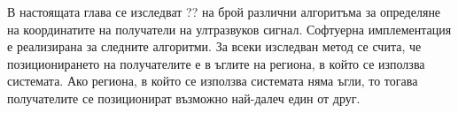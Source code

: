 В настоящата глава се изследват ?? на брой различни алгоритъма за определяне на координатите на получатели на ултразвуков сигнал. Софтуерна имплементация е реализирана за следните алгоритми. За всеки изследван метод се счита, че позиционирането на получателите е в ъглите на региона, в който се използва системата. Ако региона, в който се използва системата няма ъгли, то тогава получателите се позиционират възможно най-далеч един от друг. 



\pagebreak



\pagebreak



\pagebreak



\pagebreak



\pagebreak


\pagebreak


\pagebreak
